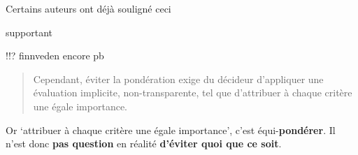 %
%
%
Certains auteurs ont déjà souligné ceci

\citeauthor{rowley_aggregating_2012} supportant

!!? finnveden encore pb

\blockcquote{rowley_aggregating_2012}{
Cependant, éviter la pondération exige du décideur d'appliquer une évaluation implicite, non-transparente, tel que d'attribuer à chaque critère une égale importance.
}
Or `attribuer à chaque critère une égale importance', c'est équi-\textbf{pondérer}.
Il n'est donc \textbf{pas question} en réalité \textbf{d'éviter quoi que ce soit}.


